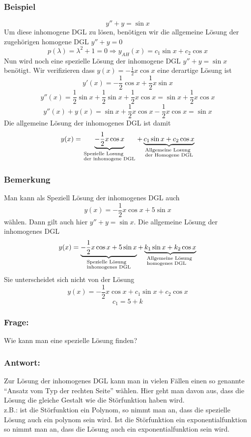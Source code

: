 \subsubsection*{Beispiel}
$$y''+y=\sin x$$
Um diese inhomogene DGL zu lösen, benötigen wir die allgemeine Lösung der zugehörigen homogene DGL $y''+y=0$$$p(\lambda)=\lambda^2+1=0\Rightarrow y_{AH}(x)=c_1\sin x+c_2\cos x$$ Nun wird noch eine spezielle Lösung der inhomogene DGL $y''+y=\sin x$ benötigt. Wir verifizieren dass $y(x)=-\frac{1}{2}x\cos x$ eine derartige Lösung ist
$$y'(x)=-\frac{1}{2}\cos x+\frac{1}{2}x\sin x$$
$$y''(x)=\frac{1}{2}\sin x+\frac{1}{2}\sin x+\frac{1}{2}x\cos x=\sin x+\frac{1}{2}x\cos x$$
$$y''(x)+y(x)=\sin x+\frac{1}{2}x\cos x-\frac{1}{2}x\cos x=\sin x$$ Die allgemeine Lösung der inhomogenes DGL ist damit $$y(x) = \underbrace { - \frac{1}{2}x\cos x}_{\scriptstyle{\text{Spezielle Losung }}\hfill\atop
\scriptstyle{\text{der inhomogene DGL}}\hfill} + \underbrace {{c_1}\sin x + {c_2}\cos x}_{\scriptstyle{\text{Allgemeine Losung }}\hfill\atop
\scriptstyle{\text{der Homogene DGL}}\hfill}$$
\subsubsection*{Bemerkung}
Man kann als Speziell Lösung der inhomogenes DGL auch $$y(x)=-\frac{1}{2}x\cos x+5\sin x$$ wählen. Dann gilt auch hier $y''+y=\sin x$. Die allgemeine Lösung der inhomogenes DGL 
$$y(x) = \underbrace { - \frac{1}{2}x\cos x + 5\sin x}_{\scriptstyle{\text{Spezielle Lösung }}\hfill\atop
\scriptstyle{\text{inhomogenes DGL}}\hfill} + \underbrace {{k_1}\sin x + {k_2}\cos x}_{\scriptstyle{\text{Allgemeine Lösung }}\hfill\atop
\scriptstyle{\text{homogenes DGL}}\hfill}$$ Sie unterscheidet sich nicht von der Lösung $$y(x)=-\frac{1}{2}x\cos x+c_1\sin x+c_2\cos x$$$$c_1=5+k$$
\subsubsection*{Frage:}
Wie kann man eine spezielle Lösung finden?
\subsubsection*{Antwort:}
Zur Lösung der inhomogenes DGL kann man in vielen Fällen einen so genannte ``Ansatz vom Typ der rechten Seite'' wählen. Hier geht man davon aus, dass die Lösung die gleiche Gestalt wie die Störfunktion haben wird.\\

\noindent z.B.: ist die Störfunktion ein Polynom, so nimmt man an, dass die spezielle Lösung auch ein polynom sein wird. Ist die Störfunktion ein exponentialfunktion so nimmt man an, dass die Lösung auch ein exponentialfunktion sein wird.


